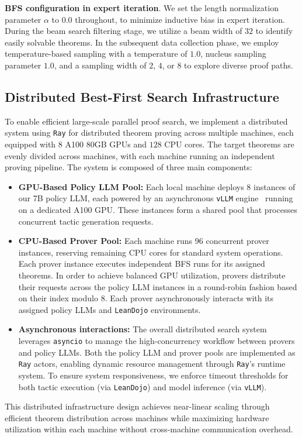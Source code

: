 \documentclass[10pt,english]{article}
\begin{document}
\textbf{BFS configuration in expert iteration}. We set the length normalization parameter $\alpha$ to $0.0$ throughout, to minimize inductive bias in expert iteration. During the beam search filtering stage, we utilize a beam width of $32$ to identify easily solvable theorems. In the subsequent data collection phase, we employ temperature-based sampling with a temperature of $1.0$, nucleus sampling parameter $1.0$, and a sampling width of $2$, $4$, or $8$ to explore diverse proof paths. 

\subsection{Distributed Best-First Search Infrastructure}

To enable efficient large-scale parallel proof search, we implement a distributed system using \texttt{Ray} for distributed theorem proving across multiple machines, each equipped with $8$ A100 80GB GPUs and $128$ CPU cores. The target theorems are evenly divided across machines, with each machine running an independent proving pipeline. The system is composed of three main components:
\begin{itemize}
\item \textbf{GPU-Based Policy LLM Pool:} Each local machine deploys 8 instances of our 7B policy LLM, each powered by an asynchronous \texttt{vLLM} engine~\citep{vllm} running on a dedicated A100 GPU. These instances form a shared pool that processes concurrent tactic generation requests.

\item \textbf{CPU-Based Prover Pool:} Each machine runs $96$ concurrent prover instances, reserving remaining CPU cores for standard system operations. Each prover instance executes independent BFS runs for its assigned theorems. In order to achieve balanced GPU utilization, provers distribute their requests across the policy LLM instances in a round-robin fashion based on their index modulo $8$. Each prover asynchronously interacts with its assigned policy LLMs and \texttt{LeanDojo} environments.

\item \textbf{Asynchronous interactions:} The overall distributed search system leverages \texttt{asyncio} to manage the high-concurrency workflow between provers and policy LLMs. Both the policy LLM and prover pools are implemented as \texttt{Ray} actors, enabling dynamic resource management through \texttt{Ray}'s runtime system. To ensure system responsiveness, we enforce timeout thresholds for both tactic execution (via \texttt{LeanDojo}) and model inference (via \texttt{vLLM}).
\end{itemize}
This distributed infrastructure design achieves near-linear scaling through efficient theorem distribution across machines while maximizing hardware utilization within each machine without cross-machine communication overhead.
\end{document}

